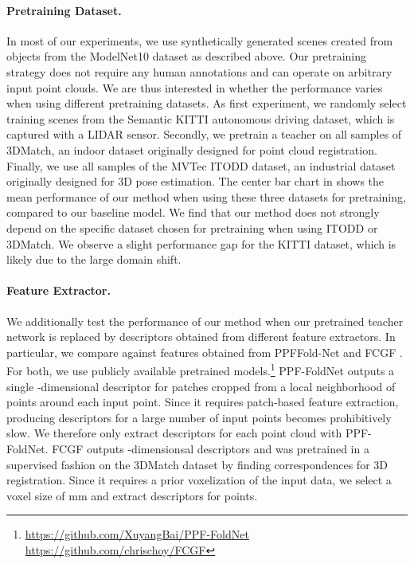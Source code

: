 \documentclass[twoside,11pt]{article}
\begin{document}
\paragraph{\textbf{Pretraining Dataset.}} In most of our experiments, we use synthetically generated scenes created from objects from the ModelNet10 dataset as described above. Our pretraining strategy does not require any human annotations and can operate on arbitrary input point clouds. We are thus interested in whether the performance varies when using different pretraining datasets. 
As first experiment, we randomly select  training scenes from the Semantic KITTI autonomous driving dataset, which is captured with a LIDAR sensor. Secondly, we pretrain a teacher on all samples of 3DMatch, an indoor dataset originally designed for point cloud registration. Finally, we use all samples of the MVTec ITODD dataset, an industrial dataset originally designed for 3D pose estimation. 
The center bar chart in   shows the mean performance of our method when using these three datasets for pretraining, compared to our baseline model. 
We find that our method does not strongly depend on the specific dataset chosen for pretraining when using ITODD or 3DMatch. We observe a slight performance gap for the KITTI dataset, which is likely due to the large domain shift.
 

\paragraph{\textbf{Feature Extractor.}} 
We additionally test the performance of our method when our pretrained teacher network is replaced by descriptors obtained from different feature extractors.
In particular, we compare against features obtained from PPFFold-Net \citep{PPF_Fold_Net} and FCGF \citep{choy2019fcgf}. For both, we use publicly available pretrained models.\footnote{\url{https://github.com/XuyangBai/PPF-FoldNet}\\\url{https://github.com/chrischoy/FCGF}} 
PPF-FoldNet outputs a single -dimensional descriptor for patches cropped from a local neighborhood of  points around each input point. Since it requires patch-based feature extraction, producing descriptors for a large number of input points becomes prohibitively slow. We therefore only extract  descriptors for each point cloud with PPF-FoldNet.
FCGF outputs -dimensionsal descriptors and was pretrained in a supervised fashion on the 3DMatch dataset by finding correspondences for 3D registration. Since it requires a prior voxelization of the input data, we select a voxel size of mm and extract descriptors for  points. 
\end{document}
